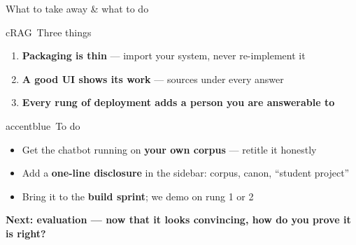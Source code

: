 \begin{frame}{What to take away \& what to do}
  \begin{featbox}{cRAG}{\faCheckCircle\ Three things}
    \small
    \begin{enumerate}
      \item \textbf{Packaging is thin} --- import your system, never re-implement it
      \item \textbf{A good UI shows its work} --- sources under every answer
      \item \textbf{Every rung of deployment adds a person you are answerable to}
    \end{enumerate}
  \end{featbox}
  \vspace{2pt}
  \begin{featbox}{accentblue}{\faLaptopCode\ To do}
    \small
    \begin{itemize}
      \item Get the chatbot running on \textbf{your own corpus} --- retitle it honestly
      \item Add a \textbf{one-line disclosure} in the sidebar: corpus, canon, ``student project''
      \item Bring it to the \textbf{build sprint}; we demo on rung 1 or 2
    \end{itemize}
  \end{featbox}
  \vspace{2pt}
  \begin{center}\small\color{labnavy}\bfseries
    Next: \textbf{evaluation} --- now that it looks convincing, how do you prove it is right?\end{center}
\end{frame}


